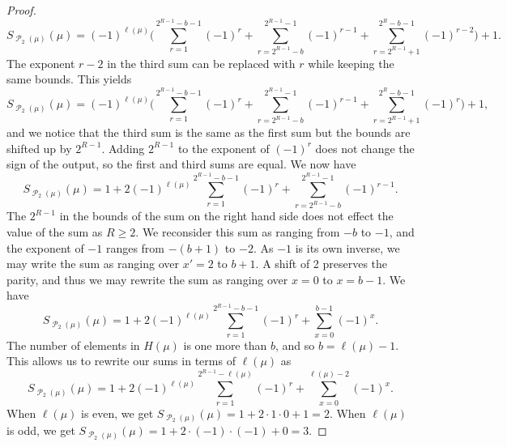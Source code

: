 \documentclass[10pt,a4paper]{amsart}
\DeclareMathOperator{\p}{\mathcal{P}}
\begin{document}
\begin{proof}
\[
 S_{\p_2(\mu)}({\mu}) = (-1)^{\ell(\mu)} \Bigg(\sum\limits_{r = 1}^{2^{R-1}-b-1} (-1)^{r} + \sum\limits_{r = 2^{R-1}-b}^{2^{R-1}-1} (-1)^{r-1} + \sum\limits_{r=2^{R-1} +1}^{2^{R}-b-1} (-1)^{r-2}\Bigg) + 1.
\]
The exponent $r-2$ in the third sum can be replaced with $r$ while keeping the same bounds. This yields
\[
 S_{\p_2(\mu)}({\mu}) = (-1)^{\ell(\mu)} \Bigg(\sum\limits_{r = 1}^{2^{R-1}-b-1} (-1)^{r} + \sum\limits_{r = 2^{R-1}-b}^{2^{R-1}-1} (-1)^{r-1} + \sum\limits_{r=2^{R-1} +1}^{2^{R}-b-1} (-1)^{r}\Bigg) + 1,
\]
and we notice that the third sum is the same as the first sum but the bounds are shifted up by $2^{R-1}$. Adding $2^{R-1}$ to the exponent of $(-1)^r$ does not change the sign of the output, so the first and third sums are equal. We now have 
\[
S_{\p_2(\mu)}({\mu})  = 1 + 2(-1)^{\ell(\mu)}\sum\limits_{r = 1}^{2^{R-1}-b - 1} (-1)^{r} + \sum\limits_{r = 2^{R-1}-b}^{2^{R-1}-1} (-1)^{r-1}.
\]
The $2^{R-1}$ in the bounds of the sum on the right hand side does not effect the value of the sum as $R\geq 2$. We reconsider this sum as ranging from $-b$ to $-1$, and the exponent of $-1$ ranges from $-(b+1)$ to $-2$. As $-1$ is its own inverse, we may write the sum as ranging over $x' = 2$ to $b+1$. A shift of 2 preserves the parity, and thus we may rewrite the sum as ranging over $x = 0$ to $x = b-1$.
We have 
\[
S_{\p_2(\mu)}({\mu})  = 1 + 2(-1)^{\ell(\mu)}\sum\limits_{r = 1}^{2^{R-1}-b - 1} (-1)^{r} + \sum\limits_{x=0}^{b-1} (-1)^{x}.
\]
The number of elements in $H(\mu)$ is one more than $b$, and so $b=\ell(\mu)-1$. This allows us to rewrite our sums in terms of $\ell(\mu)$ as
\[
S_{\p_2(\mu)}({\mu})  = 1 + 2(-1)^{\ell(\mu)}\sum\limits_{r = 1}^{2^{R-1}-\ell(\mu)} (-1)^{r} + \sum\limits_{x=0}^{\ell(\mu) - 2} (-1)^x.
\]
When $\ell(\mu)$ is even, we get $S_{\p_2(\mu)}({\mu}) = 1 + 2\cdot 1\cdot 0 + 1 = 2$. When $\ell(\mu)$ is odd, we get $S_{\p_2(\mu)}({\mu})  = 1 + 2\cdot (-1) \cdot (-1) + 0 = 3$.
\end{proof}
\end{document}
